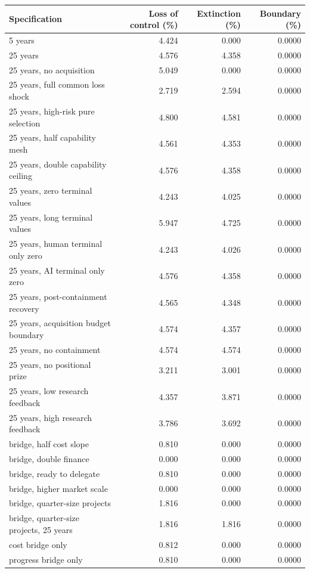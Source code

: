 \begin{tabular}{lrrr}
\toprule
Specification & Loss of control (\%) & Extinction (\%) & Boundary (\%) \\
\midrule
5 years & 4.424 & 0.000 & 0.0000 \\
25 years & 4.576 & 4.358 & 0.0000 \\
25 years, no acquisition & 5.049 & 0.000 & 0.0000 \\
25 years, full common loss shock & 2.719 & 2.594 & 0.0000 \\
25 years, high-risk pure selection & 4.800 & 4.581 & 0.0000 \\
25 years, half capability mesh & 4.561 & 4.353 & 0.0000 \\
25 years, double capability ceiling & 4.576 & 4.358 & 0.0000 \\
25 years, zero terminal values & 4.243 & 4.025 & 0.0000 \\
25 years, long terminal values & 5.947 & 4.725 & 0.0000 \\
25 years, human terminal only zero & 4.243 & 4.026 & 0.0000 \\
25 years, AI terminal only zero & 4.576 & 4.358 & 0.0000 \\
25 years, post-containment recovery & 4.565 & 4.348 & 0.0000 \\
25 years, acquisition budget boundary & 4.574 & 4.357 & 0.0000 \\
25 years, no containment & 4.574 & 4.574 & 0.0000 \\
25 years, no positional prize & 3.211 & 3.001 & 0.0000 \\
25 years, low research feedback & 4.357 & 3.871 & 0.0000 \\
25 years, high research feedback & 3.786 & 3.692 & 0.0000 \\
bridge, half cost slope & 0.810 & 0.000 & 0.0000 \\
bridge, double finance & 0.000 & 0.000 & 0.0000 \\
bridge, ready to delegate & 0.810 & 0.000 & 0.0000 \\
bridge, higher market scale & 0.000 & 0.000 & 0.0000 \\
bridge, quarter-size projects & 1.816 & 0.000 & 0.0000 \\
bridge, quarter-size projects, 25 years & 1.816 & 1.816 & 0.0000 \\
cost bridge only & 0.812 & 0.000 & 0.0000 \\
progress bridge only & 0.810 & 0.000 & 0.0000 \\
\bottomrule
\end{tabular}

